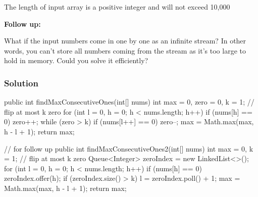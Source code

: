 The length of input array is a positive integer and will not exceed 10,000

\textbf{Follow up:}

What if the input numbers come in one by one as an infinite stream? In other words, you can't store all numbers coming from the stream as it's too large to hold in memory. Could you solve it efficiently?
\subsubsection{Solution}

\begin{Code}
public int findMaxConsecutiveOnes(int[] nums) {
    int max = 0, zero = 0, k = 1; // flip at most k zero
    for (int l = 0, h = 0; h < nums.length; h++) {
        if (nums[h] == 0)
            zero++;
        while (zero > k)
            if (nums[l++] == 0)
                zero--;
        max = Math.max(max, h - l + 1);
    }
    return max;
}

// for follow up
public int findMaxConsecutiveOnes2(int[] nums) {
    int max = 0, k = 1; // flip at most k zero
    Queue<Integer> zeroIndex = new LinkedList<>();
    for (int l = 0, h = 0; h < nums.length; h++) {
        if (nums[h] == 0)
            zeroIndex.offer(h);
        if (zeroIndex.size() > k)
            l = zeroIndex.poll() + 1;
        max = Math.max(max, h - l + 1);
    }
    return max;
}
\end{Code}

\newpage